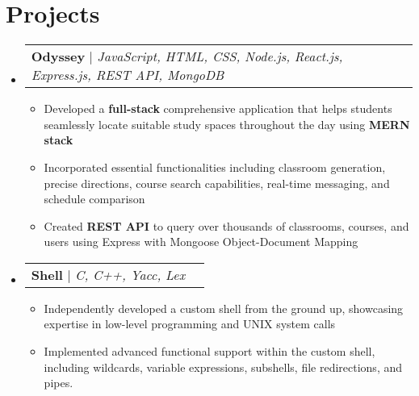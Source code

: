 \documentclass[letterpaper,11pt]{article}
\makeatletter
\newcommand{\resumeItem}[1]{
  \item\small{
    {#1 \vspace{-2pt}}
  }
}
\newcommand{\resumeProjectHeading}[2]{
    \item
    \begin{tabular*}{0.97\textwidth}{l@{\extracolsep{\fill}}r}
      \small#1 & #2 \\
    \end{tabular*}\vspace{-7pt}
}
\newcommand{\resumeSubHeadingListStart}{\begin{itemize}[leftmargin=0.15in, label={}]}
\newcommand{\resumeSubHeadingListEnd}{\end{itemize}}
\newcommand{\resumeItemListStart}{\begin{itemize}}
\newcommand{\resumeItemListEnd}{\end{itemize}\vspace{-5pt}}
\makeatother
\begin{document}
\section{Projects}
    \resumeSubHeadingListStart
      \resumeProjectHeading
          {\textbf{Odyssey} $|$ \emph{JavaScript, HTML, CSS, Node.js, React.js, Express.js, REST API, MongoDB}}{}
          \resumeItemListStart
            \resumeItem{Developed a \textbf{full-stack} comprehensive application that helps students seamlessly locate suitable study spaces throughout the day using \textbf{MERN stack}}
            \resumeItem{Incorporated essential functionalities including classroom generation, precise directions, course search capabilities, real-time messaging, and schedule comparison}
            \resumeItem{Created \textbf{REST API} to query over thousands of classrooms, courses, and users using Express with Mongoose Object-Document Mapping}
          \resumeItemListEnd
      \resumeProjectHeading
          {\textbf{Shell} $|$ \emph{C, C++, Yacc, Lex}}{}
          \resumeItemListStart
            \resumeItem{Independently developed a custom shell from the ground up, showcasing expertise in low-level programming and UNIX system calls}
            \resumeItem{Implemented advanced functional support within the custom shell, including wildcards, variable expressions, subshells, file redirections, and pipes.}
          \resumeItemListEnd
    \resumeSubHeadingListEnd
\end{document}
